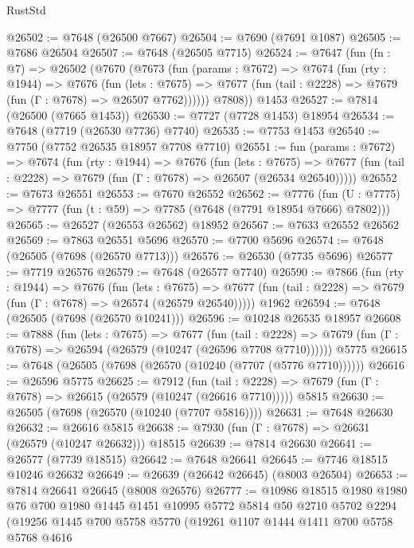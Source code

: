 \begin{lexlean}{RustStd}
\begin{coremodule}
{\begin{coremodule}
{{{{{{{{{{{{{{{{{{{{{{{{{{{{{{{{{{{{{{{{{{{{{{{{{{{{{@26502 := @7648 (@26500 @7667)
@26504 := @7690 (@7691 @1087)
@26505 := @7686 @26504
@26507 := @7648 (@26505 @7715)
@26524 := @7647
    (fun (fn : @7) =>
    @26502
      (@7670
        (@7673
          (fun (params : @7672) =>
          @7674
            (fun (rty : @1944) =>
            @7676
              (fun (lets : @7675) =>
              @7677 (fun (tail : @2228) => @7679 (fun (Γ : @7678) => @26507 @7762))))))
        @7808))
    @1453
@26527 := @7814 (@26500 (@7665 @1453))
@26530 := @7727 (@7728 @1453) @18954
@26534 := @7648 (@7719 (@26530 @7736) @7740)
@26535 := @7753 @1453
@26540 := @7750 (@7752 @26535 @18957 @7708 @7710)
@26551 := fun (params : @7672) =>
  @7674
    (fun (rty : @1944) =>
    @7676
      (fun (lets : @7675) =>
      @7677 (fun (tail : @2228) => @7679 (fun (Γ : @7678) => @26507 (@26534 @26540)))))
@26552 := @7673 @26551
@26553 := @7670 @26552
@26562 := @7776
    (fun (U : @7775) => @7777 (fun (t : @59) => @7785 (@7648 (@7791 @18954 @7666) @7802)))
@26565 := @26527 (@26553 @26562) @18952
@26567 := @7633 @26552 @26562
@26569 := @7863 @26551 @5696
@26570 := @7700 @5696
@26574 := @7648 (@26505 (@7698 (@26570 @7713)))
@26576 := @26530 (@7735 @5696)
@26577 := @7719 @26576
@26579 := @7648 (@26577 @7740)
@26590 := @7866
    (fun (rty : @1944) =>
    @7676
      (fun (lets : @7675) =>
      @7677 (fun (tail : @2228) => @7679 (fun (Γ : @7678) => @26574 (@26579 @26540)))))
    @1962
@26594 := @7648 (@26505 (@7698 (@26570 @10241)))
@26596 := @10248 @26535 @18957
@26608 := @7888
    (fun (lets : @7675) =>
    @7677
      (fun (tail : @2228) =>
      @7679 (fun (Γ : @7678) => @26594 (@26579 (@10247 (@26596 @7708 @7710))))))
    @5775
@26615 := @7648 (@26505 (@7698 (@26570 (@10240 (@7707 (@5776 @7710))))))
@26616 := @26596 @5775
@26625 := @7912
    (fun (tail : @2228) => @7679 (fun (Γ : @7678) => @26615 (@26579 (@10247 (@26616 @7710)))))
    @5815
@26630 := @26505 (@7698 (@26570 (@10240 (@7707 @5816))))
@26631 := @7648 @26630
@26632 := @26616 @5815
@26638 := @7930 (fun (Γ : @7678) => @26631 (@26579 (@10247 @26632))) @18515
@26639 := @7814 @26630
@26641 := @26577 (@7739 @18515)
@26642 := @7648 @26641
@26645 := @7746 @18515 @10246 @26632
@26649 := @26639 (@26642 @26645) (@8003 @26504)
@26653 := @7814 @26641 @26645 (@8008 @26576)
@26777 := @10986
    @18515
    @1980
    @1980
    @76
    @700
    @1980
    @1445
    @1451
    @10995
    @5772
    @5814
    @50
    @2710
    @5702
    @2294
    (@19256
      @1445
      @700
      @5758
      @5770
      (@19261
        @1107
        @1444
        @1411
        @700
        @5758
        @5768
        @4616
}}}}}}}}}}}}}}}}}}}}}}}}}}}}}}}}}}}}}}}}}}}}}}}}}}}}}
\end{coremodule}}
\end{coremodule}
\end{lexlean}
